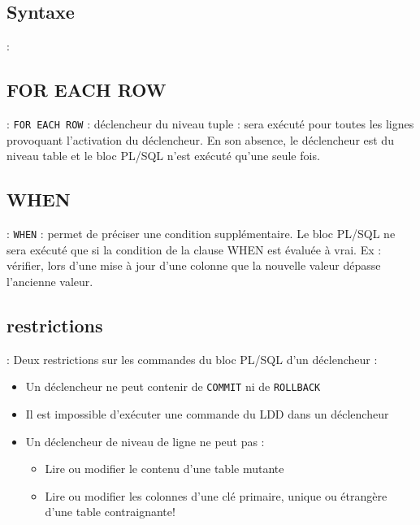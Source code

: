 \documentclass[10pt]{beamer}
\begin{document}
\subsection{Syntaxe}
\begin{frame}{\secname : \subsecname}
    
\end{frame}
\subsection{FOR EACH ROW}
\begin{frame}{\secname : \subsecname}
    \lstinline[language=plsql]!FOR EACH ROW! : déclencheur du niveau tuple : sera exécuté pour toutes les lignes provoquant l'activation du déclencheur.  En son absence, le déclencheur est du niveau table et le bloc PL/SQL n'est exécuté qu'une seule fois.
\end{frame}

\subsection{WHEN}
\begin{frame}{\secname : \subsecname}
    \lstinline[language=plsql]!WHEN! : permet de préciser une condition supplémentaire. Le bloc PL/SQL ne sera exécuté que si la condition de la clause WHEN est évaluée à vrai.
    Ex : vérifier, lors d'une mise à jour d'une colonne que la nouvelle valeur dépasse l'ancienne valeur.
\end{frame}

\subsection{restrictions}
\begin{frame}{\secname : \subsecname}
    Deux restrictions sur les commandes du bloc PL/SQL d'un déclencheur :
    \begin{itemize}
        \item Un déclencheur ne peut contenir de \lstinline[language=plsql]!COMMIT! ni de \lstinline[language=plsql]!ROLLBACK!
        \item Il est impossible d'exécuter une commande du LDD dans un déclencheur
        \item Un déclencheur  de niveau de ligne ne peut pas :
              \begin{itemize}
                  \item Lire ou modifier le contenu d'une table mutante
                  \item Lire ou modifier les colonnes d'une clé primaire, unique ou étrangère d'une table contraignante!
              \end{itemize}
    \end{itemize}
\end{frame}
\end{document}

